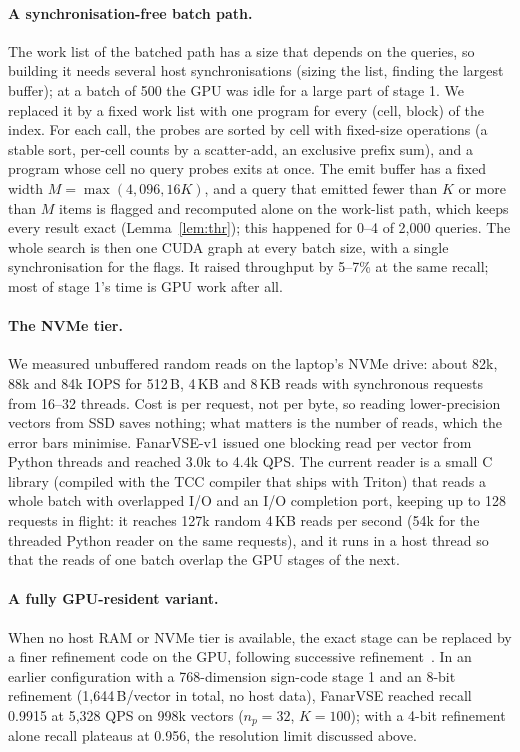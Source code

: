 \documentclass[10pt]{article}
\begin{document}
\paragraph{A synchronisation-free batch path.} The work list of the batched path has a size that depends on the queries, so building it needs several host synchronisations (sizing the list, finding the largest buffer); at a batch of 500 the GPU was idle for a large part of stage 1. We replaced it by a fixed work list with one program for every (cell, block) of the index. For each call, the probes are sorted by cell with fixed-size operations (a stable sort, per-cell counts by a scatter-add, an exclusive prefix sum), and a program whose cell no query probes exits at once. The emit buffer has a fixed width $M=\max(4{,}096,16K)$, and a query that emitted fewer than $K$ or more than $M$ items is flagged and recomputed alone on the work-list path, which keeps every result exact (Lemma~\ref{lem:thr}); this happened for 0--4 of 2{,}000 queries. The whole search is then one CUDA graph at every batch size, with a single synchronisation for the flags. It raised throughput by 5--7\% at the same recall; most of stage 1's time is GPU work after all.

\paragraph{The NVMe tier.} We measured unbuffered random reads on the laptop's NVMe drive: about 82k, 88k and 84k IOPS for 512\,B, 4\,KB and 8\,KB reads with synchronous requests from 16--32 threads. Cost is per request, not per byte, so reading lower-precision vectors from SSD saves nothing; what matters is the number of reads, which the error bars minimise. FanarVSE-v1 issued one blocking read per vector from Python threads and reached 3.0k to 4.4k QPS. The current reader is a small C library (compiled with the TCC compiler that ships with Triton) that reads a whole batch with overlapped I/O and an I/O completion port, keeping up to 128 requests in flight: it reaches 127k random 4\,KB reads per second (54k for the threaded Python reader on the same requests), and it runs in a host thread so that the reads of one batch overlap the GPU stages of the next.

\paragraph{A fully GPU-resident variant.} When no host RAM or NVMe tier is available, the exact stage can be replaced by a finer refinement code on the GPU, following successive refinement~\cite{equitz1991successive}. In an earlier configuration with a 768-dimension sign-code stage 1 and an 8-bit refinement (1{,}644\,B/vector in total, no host data), FanarVSE reached recall 0.9915 at 5{,}328 QPS on 998k vectors ($n_p=32$, $K=100$); with a 4-bit refinement alone recall plateaus at 0.956, the resolution limit discussed above.
\end{document}
